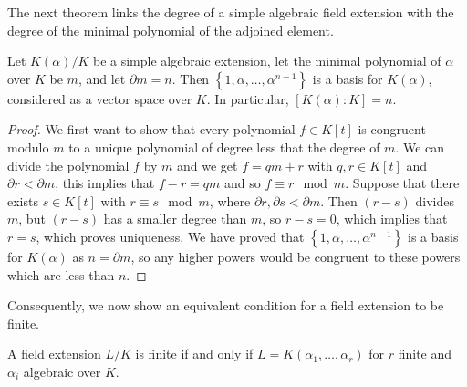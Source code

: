 The next theorem links the degree of a simple algebraic field extension with the degree of the minimal polynomial of the adjoined element. 
\begin{theorem} \label{thm:degree-theorem}
    Let $K(\alpha) / K$ be a simple algebraic extension, let the minimal polynomial of $\alpha$ over $K$ be $m$, and let $\partial m=n$. Then $\left\{1, \alpha, \ldots, \alpha^{n-1}\right\}$ is a basis for $K(\alpha)$, considered as a vector space over $K$. In particular, \([K(\alpha):K]=n\). \label{algebraic case}
\end{theorem}

\begin{proof}
    We first want to show that every polynomial \(f \in K[t]\) is congruent modulo \(m\) to a unique polynomial of degree less that the degree of \(m\). We can divide the polynomial \(f\) by \(m\) and we get \(f = qm + r\) with \(q,r \in K[t]\) and \(\partial r < \partial m\), this implies that \(f - r =qm\) and so \(f \equiv r \mod m\). Suppose that there exists \(s \in K[t]\) with \(r \equiv s \mod m\), where \(\partial r, \partial s < \partial m\). Then \((r - s)\) divides \(m\), but \((r-s)\) has a smaller degree than \(m\), so \(r-s=0\), which implies that \(r=s\), which proves uniqueness. We have proved that $\left\{1, \alpha, \ldots, \alpha^{n-1}\right\}$ is a basis for \(K(\alpha)\) as \(n = \partial m\), so any higher powers would be congruent to these powers which are less than \(n\).
    \end{proof}

%
Consequently, we now show an equivalent condition for a field extension to be finite. 

\begin{theorem} \label{thm:finite-equi-def}
    A field extension $L/K$ is finite if and only if $L = K(\alpha_1, \dots, \alpha_r)$ for $r$ finite and $\alpha_i$ algebraic over $K$. 
\end{theorem}


